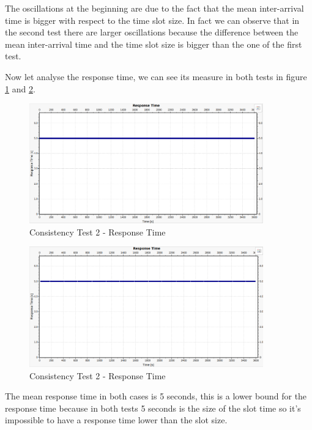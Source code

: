 \noindent The oscillations at the beginning are due to the fact that the mean inter-arrival time is bigger with respect to the time slot size. In fact we can observe that in the second test there are larger oscillations because the difference between the mean inter-arrival time and the time slot size is bigger than the one of the first test.

\noindent Now let analyse the response time, we can see its measure in both tests in figure \ref{img: consistencyTest1a_responsetime} and \ref{img: consistencyTest1b_responsetime}.

\begin{figure}[H]
	\centering
	\includegraphics[width=0.9\textwidth]{img/consistencytest1a_responsetime.png}
	\caption{Consistency Test 2 - Response Time}
	\label {img: consistencyTest1a_responsetime}
\end{figure}

\begin{figure}[H]
	\centering
	\includegraphics[width=0.9\textwidth]{img/consistencytest1b_responsetime.png}
	\caption{Consistency Test 2 - Response Time}
	\label {img: consistencyTest1b_responsetime}
\end{figure}


\noindent The mean response time in both cases is 5 seconds, this is a lower bound for the response time because in both tests 5 seconds is the size of the slot time so it's impossible to have a response time lower than the slot size.

